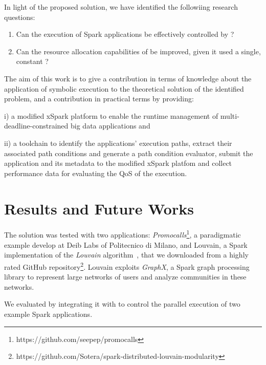 In light of the proposed solution, we have identified the followiing research questions:

\begin{enumerate}[\boldmath$RQ_1 : $] 
	\item Can the execution of Spark applications be effectively controlled by \dSymb?
	\item Can the resource allocation capabilities of \cSpark be improved, given it used a single, constant \plan?
\end{enumerate}

 The aim of this work is to give a contribution in terms of knowledge about the application of symbolic execution to the theoretical solution of the identified  problem, and a contribution in practical terms by providing: 
 
 i) a modified xSpark platform to enable the runtime management of multi-\plan deadline-constrained big data applications and 
 
 ii) a toolchain to identify the applications' execution paths,  extract their associated path conditions and generate a path condition evaluator, submit the application and its metadata to the modified xSpark platfom and collect performance data for evaluating the QoS of the execution. 

\section*{Results and Future Works}\label{sec:results_future_works}
The solution was tested with two applications:  \textit{Promocalls}\footnote{https://github.com/seepep/promocalls}, a paradigmatic example  develop at Deib Labs of Politecnico di Milano, and Louvain, a Spark implementation of the \textit{Louvain} algorithm~\cite{Louvain}, that we downloaded from a highly rated GitHub repository\footnote{https://github.com/Sotera/spark-distributed-louvain-modularity}. Louvain exploits \textit{GraphX}, a Spark graph processing library to represent large networks of users and analyze communities in these networks. 

We evaluated  \dSymb by integrating it with \cSpark to control the parallel execution of two example Spark applications. 



